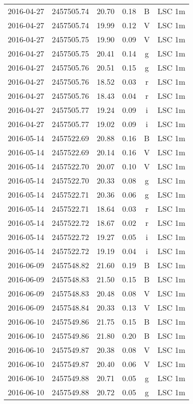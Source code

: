 \begin{table}
\begin{tabular}{cccccc}
2016-04-27 & 2457505.74 & 20.70 & 0.18 & B & LSC 1m \\
2016-04-27 & 2457505.74 & 19.99 & 0.12 & V & LSC 1m \\
2016-04-27 & 2457505.75 & 19.90 & 0.09 & V & LSC 1m \\
2016-04-27 & 2457505.75 & 20.41 & 0.14 & g & LSC 1m \\
2016-04-27 & 2457505.76 & 20.51 & 0.15 & g & LSC 1m \\
2016-04-27 & 2457505.76 & 18.52 & 0.03 & r & LSC 1m \\
2016-04-27 & 2457505.76 & 18.43 & 0.04 & r & LSC 1m \\
2016-04-27 & 2457505.77 & 19.24 & 0.09 & i & LSC 1m \\
2016-04-27 & 2457505.77 & 19.02 & 0.09 & i & LSC 1m \\
2016-05-14 & 2457522.69 & 20.88 & 0.16 & B & LSC 1m \\
2016-05-14 & 2457522.69 & 20.14 & 0.16 & V & LSC 1m \\
2016-05-14 & 2457522.70 & 20.07 & 0.10 & V & LSC 1m \\
2016-05-14 & 2457522.70 & 20.33 & 0.08 & g & LSC 1m \\
2016-05-14 & 2457522.71 & 20.36 & 0.06 & g & LSC 1m \\
2016-05-14 & 2457522.71 & 18.64 & 0.03 & r & LSC 1m \\
2016-05-14 & 2457522.72 & 18.67 & 0.02 & r & LSC 1m \\
2016-05-14 & 2457522.72 & 19.27 & 0.05 & i & LSC 1m \\
2016-05-14 & 2457522.72 & 19.19 & 0.04 & i & LSC 1m \\
2016-06-09 & 2457548.82 & 21.60 & 0.19 & B & LSC 1m \\
2016-06-09 & 2457548.83 & 21.50 & 0.15 & B & LSC 1m \\
2016-06-09 & 2457548.83 & 20.48 & 0.08 & V & LSC 1m \\
2016-06-09 & 2457548.84 & 20.33 & 0.13 & V & LSC 1m \\
2016-06-10 & 2457549.86 & 21.75 & 0.15 & B & LSC 1m \\
2016-06-10 & 2457549.86 & 21.80 & 0.20 & B & LSC 1m \\
2016-06-10 & 2457549.87 & 20.38 & 0.08 & V & LSC 1m \\
2016-06-10 & 2457549.87 & 20.40 & 0.06 & V & LSC 1m \\
2016-06-10 & 2457549.88 & 20.71 & 0.05 & g & LSC 1m \\
2016-06-10 & 2457549.88 & 20.72 & 0.05 & g & LSC 1m \\

\end{tabular}
\end{table}
